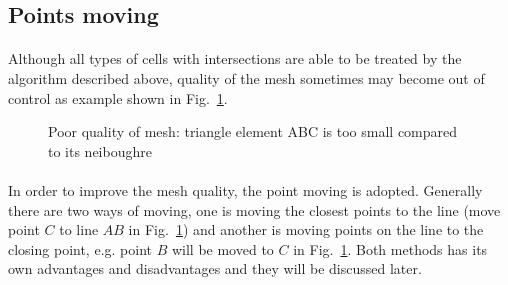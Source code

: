 \subsection{Points moving}
\label{qdt_sc:point_moving}
\paragraph{}
Although all types of cells with intersections are able to be treated by the algorithm described above, quality of the mesh sometimes may become out of control as example shown in Fig.~\ref{qdt_fig:qdt_cutting_poor_mesh_quality}.
    \begin{figure}[h!]
        \centering
        \caption[Poor quality of mesh]{Poor quality of mesh: triangle element ABC is too small compared to its neiboughre}
        \label{qdt_fig:qdt_cutting_poor_mesh_quality}
    \end{figure}
\paragraph{}
In order to improve the mesh quality, the point moving is adopted.
Generally there are two ways of moving, one is moving the closest points to the line (move point $C$ to line $AB$ in Fig.~\ref{qdt_fig:qdt_cutting_poor_mesh_quality}) and another is moving points on the line to the closing point, e.g. point $B$ will be moved to $C$ in Fig.~\ref{qdt_fig:qdt_cutting_poor_mesh_quality}.
Both methods has its own advantages and disadvantages and they will be discussed later.
